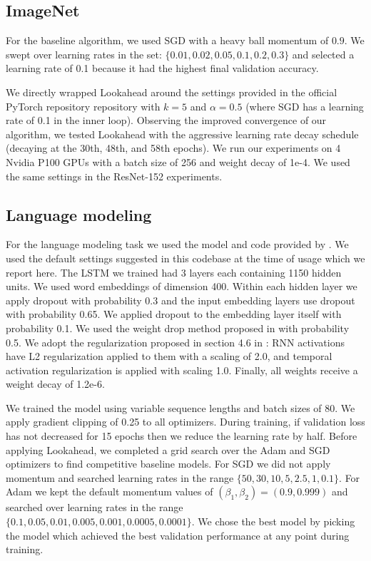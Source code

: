 \documentclass{article}
\begin{document}
\subsection{ImageNet}
For the baseline algorithm, we used SGD with a heavy ball momentum of $0.9$. We swept over learning rates in the set: $\{0.01, 0.02, 0.05, 0.1, 0.2, 0.3\}$ and selected a learning rate of 0.1 because it had the highest final validation accuracy.

We directly wrapped Lookahead around the settings provided in the official PyTorch repository repository with $k =5$ and $\alpha=0.5$ (where SGD has a learning rate of 0.1 in the inner loop). Observing the improved convergence of our algorithm, we tested Lookahead with the aggressive learning rate decay schedule (decaying at the 30th, 48th, and 58th epochs). We run our experiments on 4 Nvidia P100 GPUs with a batch size of 256 and weight decay of 1e-4. We used the same settings in the ResNet-152 experiments. 

\subsection{Language modeling}

For the language modeling task we used the model and code provided by \citet{merity2017regularizing}. We used the default settings suggested in this codebase at the time of usage which we report here. The LSTM we trained had 3 layers each containing 1150 hidden units. We used word embeddings of dimension 400.  Within each hidden layer we apply dropout with probability 0.3 and the input embedding layers use dropout with probability 0.65. We applied dropout to the embedding layer itself with probability 0.1. We used the weight drop method proposed in \citet{merity2017regularizing} with probability 0.5. We adopt the regularization proposed in section 4.6 in \citet{merity2017regularizing}: RNN activations have L2 regularization applied to them with a scaling of 2.0, and temporal activation regularization is applied with scaling 1.0. Finally, all weights receive a weight decay of 1.2e-6.

We trained the model using variable sequence lengths and batch sizes of 80. We apply gradient clipping of 0.25 to all optimizers. During training, if validation loss has not decreased for 15 epochs then we reduce the learning rate by half.  Before applying Lookahead, we completed a grid search over the Adam and SGD optimizers to find competitive baseline models. For SGD we did not apply momentum and searched learning rates in the range $\{50, 30, 10, 5, 2.5, 1, 0.1\}$. For Adam we kept the default momentum values of $(\beta_1, \beta_2) = (0.9, 0.999)$ and searched over learning rates in the range $\{0.1, 0.05, 0.01, 0.005, 0.001, 0.0005, 0.0001\}$. We chose the best model by picking the model which achieved the best validation performance at any point during training.
\end{document}
